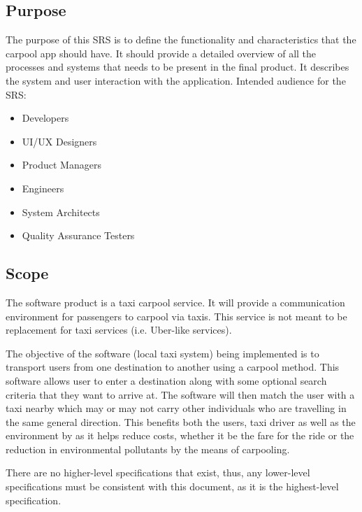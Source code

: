 \documentclass[]{article}
\begin{document}
\subsection{Purpose}
\label{sub:purpose}
The purpose of this SRS is to define the functionality and characteristics that the carpool app should have. It should provide a detailed overview of all the processes and systems that needs to be present in the final product. It describes the system and user interaction with the application. Intended audience for the SRS:
\begin{itemize}
	\item Developers
	\item UI/UX Designers
	\item Product Managers
	\item Engineers
	\item System Architects
	\item Quality Assurance Testers
\end{itemize}

\subsection{Scope}
\label{sub:scope}
The software product is a taxi carpool service. It will provide a communication environment for passengers to carpool via taxis. This service is not meant to be replacement for taxi services (i.e. Uber-like services).

The objective of the software (local taxi system) being implemented is to transport users from one destination to another using a carpool method. This software allows user to enter a destination along with some optional search criteria that they want to arrive at. The software will then match the user with a taxi nearby which may or may not carry other individuals who are travelling in the same general direction. This benefits both the users, taxi driver as well as the environment by as it helps reduce costs, whether it be the fare for the ride or the reduction in environmental pollutants by the means of carpooling.

There are no higher-level specifications that exist, thus, any lower-level specifications must be consistent with this document, as it is the highest-level specification.
\end{document}
